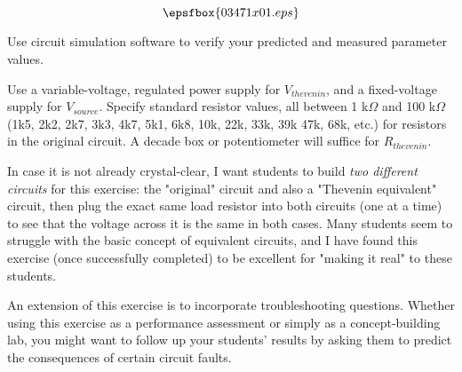 

$$\epsfbox{03471x01.eps}$$

\vfil \eject






Use circuit simulation software to verify your predicted and measured parameter values.







Use a variable-voltage, regulated power supply for $V_{thevenin}$, and a fixed-voltage supply for $V_{source}$.  Specify standard resistor values, all between 1 k$\Omega$ and 100 k$\Omega$ (1k5, 2k2, 2k7, 3k3, 4k7, 5k1, 6k8, 10k, 22k, 33k, 39k 47k, 68k, etc.) for resistors in the original circuit.  A decade box or potentiometer will suffice for $R_{thevenin}$.

In case it is not already crystal-clear, I want students to build {\it two different circuits} for this exercise: the "original" circuit and also a "Thevenin equivalent" circuit, then plug the exact same load resistor into both circuits (one at a time) to see that the voltage across it is the same in both cases.  Many students seem to struggle with the basic concept of equivalent circuits, and I have found this exercise (once successfully completed) to be excellent for "making it real" to these students.

An extension of this exercise is to incorporate troubleshooting questions.  Whether using this exercise as a performance assessment or simply as a concept-building lab, you might want to follow up your students' results by asking them to predict the consequences of certain circuit faults.




